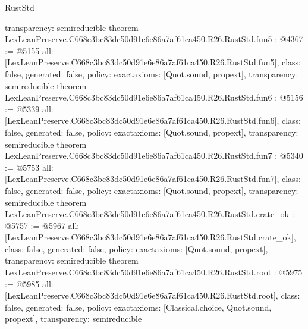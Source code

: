 \begin{lexlean}{RustStd}
\begin{coremodule}
{  transparency: semireducible
}
theorem LexLeanPreserve.C668c3bc83dc50d91e6e86a7af61ca450.R26.RustStd.fun5 : @4367 := @5155 {
  all: [LexLeanPreserve.C668c3bc83dc50d91e6e86a7af61ca450.R26.RustStd.fun5],
  class: false,
  generated: false,
  policy: exact{axioms: [Quot.sound, propext]},
  transparency: semireducible
}
theorem LexLeanPreserve.C668c3bc83dc50d91e6e86a7af61ca450.R26.RustStd.fun6 : @5156 := @5339 {
  all: [LexLeanPreserve.C668c3bc83dc50d91e6e86a7af61ca450.R26.RustStd.fun6],
  class: false,
  generated: false,
  policy: exact{axioms: [Quot.sound, propext]},
  transparency: semireducible
}
theorem LexLeanPreserve.C668c3bc83dc50d91e6e86a7af61ca450.R26.RustStd.fun7 : @5340 := @5753 {
  all: [LexLeanPreserve.C668c3bc83dc50d91e6e86a7af61ca450.R26.RustStd.fun7],
  class: false,
  generated: false,
  policy: exact{axioms: [Quot.sound, propext]},
  transparency: semireducible
}
theorem LexLeanPreserve.C668c3bc83dc50d91e6e86a7af61ca450.R26.RustStd.crate_ok : @5757 := @5967 {
  all: [LexLeanPreserve.C668c3bc83dc50d91e6e86a7af61ca450.R26.RustStd.crate_ok],
  class: false,
  generated: false,
  policy: exact{axioms: [Quot.sound, propext]},
  transparency: semireducible
}
theorem LexLeanPreserve.C668c3bc83dc50d91e6e86a7af61ca450.R26.RustStd.root : @5975 := @5985 {
  all: [LexLeanPreserve.C668c3bc83dc50d91e6e86a7af61ca450.R26.RustStd.root],
  class: false,
  generated: false,
  policy: exact{axioms: [Classical.choice, Quot.sound, propext]},
  transparency: semireducible
}


\end{coremodule}
\end{lexlean}
